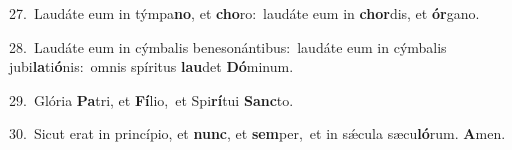{\numbfont\textcolor{\numbcolor}{27.}}~Laudáte eum in týmpa\-\textbf{no}\-, et \textbf{cho}\-ro:~\star laudáte eum in \textbf{chor}\-dis, et \textbf{ór}\-gano.\par
{\numbfont\textcolor{\numbcolor}{28.}}~Laudáte eum in cýmbalis benesonántibus:~\dagger laudáte eum in cýmbalis jubi\-\textbf{la}\-ti\-\textbf{ó}\-nis:~\star omnis spíritus \textbf{lau}\-det \textbf{Dó}\-minum.\par
{\numbfont\textcolor{\numbcolor}{29.}}~Glória \textbf{Pa}\-tri, et \textbf{Fí}\-lio,~\star et Spi\-\textbf{rí}\-tui \textbf{Sanc}\-to.\par
{\numbfont\textcolor{\numbcolor}{30.}}~Sicut erat in princípio, et \textbf{nunc}\-, et \textbf{sem}\-per,~\star et in sǽcula sæcu\-\textbf{ló}\-rum. \textbf{A}\-men.\par
